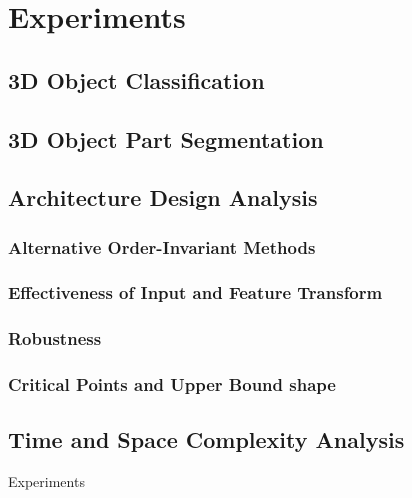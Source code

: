 \section{Experiments}

\subsection{3D Object Classification}

\subsection{3D Object Part Segmentation}

\subsection{Architecture Design Analysis}

\subsubsection{Alternative Order-Invariant Methods}
\subsubsection{Effectiveness of Input and Feature Transform}
\subsubsection{Robustness}
\subsubsection{Critical Points and Upper Bound shape}

\subsection{Time and Space Complexity Analysis}


\begin{frame}[c]{Experiments}

\end{frame}
